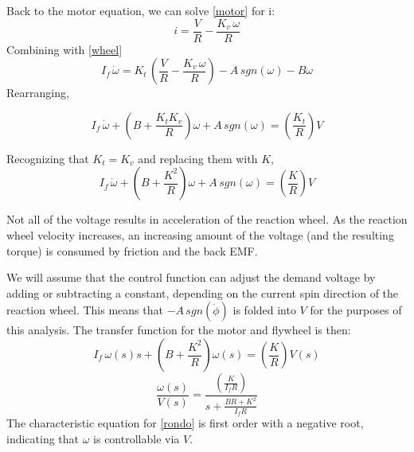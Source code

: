 \documentclass[12pt,letterpaper]{article}
\begin{document}
Back to the motor equation, we can solve \eqref{motor} for i:
%
\begin{equation}
    i = \frac{V}{R} - \frac{K_{v} \, \omega}{R}
\end{equation}
%
Combining with \eqref{wheel}
%
\begin{equation}
    I_{f} \, \dot{\omega}  =  K_{t} \, \left( \frac{V}{R} - \frac{ K_{v} \, \omega}{R} \right) - A \, sgn(\omega ) - B \omega
\end{equation}
Rearranging,

\begin{equation}
    I_{f} \, \dot{\omega} + \left( B+\frac{K_{t} K_{v}}{R} \right) \omega +A \, sgn(\omega)= \left(\frac{K_{t}} {R}\right)V 
\end{equation}

Recognizing that $K_{t} = K_{v}$ and replacing them with $K$,
\begin{equation}
    I_{f} \, \dot{\omega} + \left( B+\frac{K^2}{R} \right) \omega +A \, sgn(\omega)= \left(\frac{K} {R}\right)V 
\end{equation}

Not all of the voltage results in acceleration of the reaction wheel.  As the reaction wheel velocity increases, an
increasing amount of the voltage (and the resulting torque) is consumed by friction and the back EMF.

We will assume that the control function can adjust the demand voltage by adding or subtracting a constant, depending on the current spin direction of the reaction wheel.  This means that $-A\,sgn(\dot{\phi})$ is folded
into $V$ for the purposes of this analysis.  The transfer function for the motor and flywheel is then:
\begin{equation}
    I_{f} \, \omega(s) s + \left( B+\frac{K^2}{R} \right) \omega(s) = \left(\frac{K} {R}\right)V(s)
\end{equation}
\begin{equation}
    \frac{\omega(s)}{V(s)} =  \frac{\left(\frac{K} {I_{f}R}\right)}{s + \frac{B R +K^2}{I_{f}R }}
    \label{rondo}
\end{equation} 
The characteristic equation for \eqref{rondo} is first order with a negative root, indicating that $\omega$ is controllable via $V$.
\end{document}
